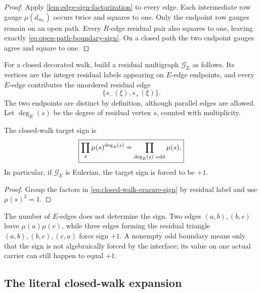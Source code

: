 \begin{proof}
Apply \cref{lem:edge-sign-factorization} to every edge.  Each intermediate
row gauge \(\mu(d_{m_\ell})\) occurs twice and squares to one.  Only the
endpoint row gauges remain on an open path.  Every \(R\)-edge residual
pair also squares to one, leaving exactly
\eqref{eq:open-path-boundary-sign}.  On a closed path the two endpoint
gauges agree and square to one.
\end{proof}

For a closed decorated walk, build a residual multigraph
\(\mathscr G_E\) as follows.  Its vertices are the integer residual labels
appearing on \(E\)-edge endpoints, and every \(E\)-edge contributes the
unordered residual edge
\[
 \{s_-(\xi),s_+(\xi)\}.
\]
The two endpoints are distinct by definition, although parallel edges are
allowed.  Let \(\deg_E(s)\) be the degree of residual vertex \(s\), counted
with multiplicity.

\begin{corollary}
\label{cor:odd-residual-boundary}
The closed-walk target sign is
\begin{equation}
 \boxed{
 \prod_s\mu(s)^{\deg_E(s)}
 =
 \prod_{\deg_E(s)\ {\rm odd}}\mu(s).}
 \label{eq:odd-residual-boundary}
\end{equation}
In particular, if \(\mathscr G_E\) is Eulerian, the target sign is forced
to be \(+1\).
\end{corollary}

\begin{proof}
Group the factors in
\eqref{eq:closed-walk-erasure-sign} by residual label and use
\(\mu(s)^2=1\).
\end{proof}

\begin{remark}
\label{rem:edge-count-not-enough}
The number of \(E\)-edges does not determine the sign.  Two edges
\((a,b),(b,c)\) leave \(\mu(a)\mu(c)\), while three edges forming the
residual triangle \((a,b),(b,c),(c,a)\) force sign \(+1\).  A nonempty odd
boundary means only that the sign is not algebraically forced by the
interface; its value on one actual carrier can still happen to equal
\(+1\).
\end{remark}

\subsection{The literal closed-walk expansion}

